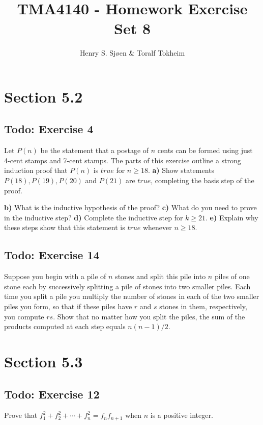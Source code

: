 \documentclass[12pt]{article}
\author{Henry S. Sjøen \& Toralf Tokheim}
\title{
  \textbf{TMA4140 - Homework Exercise Set 8}}
\begin{document}
    \maketitle
    \thispagestyle{empty}
    \pagebreak
    \tableofcontents
    \pagebreak

    \section{Section 5.2}
    \subsection{Todo: Exercise 4}
    Let $P(n)$ be the statement that a postage of $n$ cents can be formed using just 4-cent stamps and 7-cent stamps. The parts of this exercise outline a strong induction proof that $P(n)$ is $true$ for $n\geq 18$.
    \textbf{a)} Show statements $P(18),P(19),P(20)$ and $P(21)$ are $true$, completing the basis step of the proof.
    
    \textbf{b)} What is the inductive hypothesis of the proof?
    \textbf{c)} What do you need to prove in the inductive step?
    \textbf{d)} Complete the inductive step for $k \geq 21$.
    \textbf{e)} Explain why these steps show that this statement is $true$ whenever $n\geq 18$.

    \subsection{Todo: Exercise 14}
    Suppose you begin with a pile of $n$ stones and split this pile into $n$ piles of one stone each by successively splitting a pile of stones into two smaller piles. Each time you split a pile you multiply the number of stones in each of the two smaller piles you form, so that if these piles have $r$ and $s$ stones in them, respectively, you compute $rs$. Show that no matter how you split the piles, the sum of the products computed at each step equals $n(n-1)/2$.

    \section{Section 5.3}
    \subsection{Todo: Exercise 12}
    Prove that $f_1^2 +f_2^2 +\cdots+f_n^2 =f_nf_{n+1}$ when $n$ is a positive integer.
\end{document}
